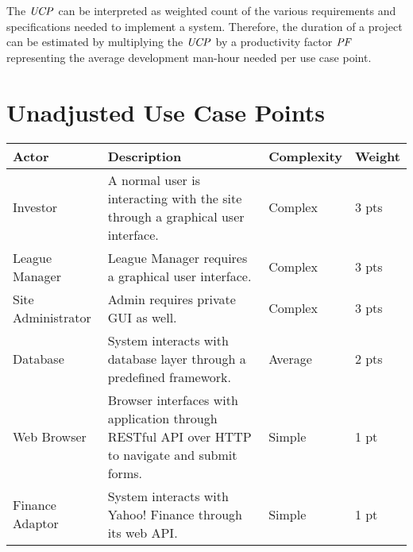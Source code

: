 The $\mathit{UCP}$ can be interpreted as weighted count of
the various requirements and specifications needed to implement a 
system. Therefore, the duration of a project can be estimated by
multiplying the $\mathit{UCP}$ by a productivity factor $\mathit{PF}$ representing
the average development man-hour needed per use case point.
\newpage
\section{Unadjusted Use Case Points}

\renewcommand\arraystretch{2}
\begin{longtable}{|p{1in}|p{3.9in}|p{0.8in}|p{.5in}|}
\hline
{\large \color{color1}Actor}&{\large \color{color1}Description}&{\large \color{color1}Complexity}&{\large \color{color1}Weight} \\ \hline
Investor&A normal user is interacting with the site through a graphical user interface.&Complex &3 pts \\ \hline 
League Manager&League Manager requires a graphical user interface.&Complex &3 pts \\ \hline 
Site Administrator&Admin requires private GUI as well.&Complex &3 pts \\ \hline 
Database&System interacts with database layer through a predefined framework.&Average &2 pts \\ \hline 
Web Browser&Browser interfaces with application through RESTful API over HTTP to navigate and submit forms.&Simple &1 pt \\ \hline 
Finance Adaptor&System interacts with Yahoo! Finance through its web API.&Simple &1 pt \\ \hline 
\end{longtable}

